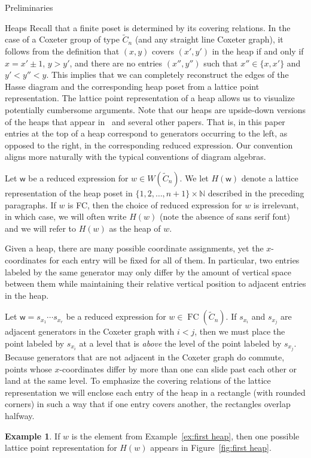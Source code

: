 \documentclass[11pt]{amsart}
\theoremstyle{definition}
\newtheorem{example}[theorem]{Example}
\numberwithin{equation}{section}
\newcommand{\N}{\mathbb{N}}
\newcommand{\C}{\widetilde{C}}
\renewcommand{\(}{\left(}
\renewcommand{\)}{\right)}
\newcommand{\w}{\mathsf{w}}
\DeclareMathOperator{\FC}{FC}
\begin{document}
\begin{section}{Preliminaries}
\begin{subsection}{Heaps}
Recall that a finite poset is determined by its covering relations.  In the case of a Coxeter group of type $\C_{n}$ (and any straight line Coxeter graph), it follows from the definition that $(x,y)$ covers $(x',y')$ in the heap if and only if $x = x' \pm 1$, $y > y'$, and there are no entries $(x'', y'')$ such that $x'' \in \{x, x'\}$ and $y'< y'' < y$.  This implies that we can completely reconstruct the edges of the Hasse diagram and the corresponding heap poset from a lattice point representation. The lattice point representation of a heap allows us to visualize potentially cumbersome arguments.  Note that our heaps are upside-down versions of the heaps that appear in~\cite{Billey2007} and several other papers.  That is, in this paper entries at the top of a heap correspond to generators occurring to the left, as opposed to the right, in the corresponding reduced expression.  Our convention aligns more naturally with the typical conventions of diagram algebras.

Let $\w$ be a reduced expression for $w \in W(\C_{n})$.  We let $H(\w)$ denote a lattice representation of the heap poset in $\{1,2,\ldots,n+1\} \times \N$ described in the preceding paragraphs.  If $w$ is FC, then the choice of reduced expression for $w$ is irrelevant, in which case, we will often write $H(w)$ (note the absence of \textsf{sans serif} font) and we will refer to $H(w)$ as the heap of $w$.

Given a heap, there are many possible coordinate assignments, yet the $x$-coordinates for each entry will be fixed for all of them.  In particular, two entries labeled by the same generator may only differ by the amount of vertical space between them while maintaining their relative vertical position to adjacent entries in the heap.

Let $\w=s_{x_1}\cdots s_{x_r}$ be a reduced expression for $w \in \FC(\C_{n})$.  If $s_{x_i}$ and $s_{x_j}$ are adjacent generators in the Coxeter graph with $i<j$, then we must place the point labeled by $s_{x_i}$ at a level that is \emph{above} the level of the point labeled by $s_{x_j}$.  Because generators that are not adjacent in the Coxeter graph do commute, points whose $x$-coordinates differ by more than one can slide past each other or land at the same level.  To emphasize the covering relations of the lattice representation we will enclose each entry of the heap in a rectangle (with rounded corners) in such a way that if one entry covers another, the rectangles overlap halfway.

\begin{example}\label{ex:second heap}
If $w$ is the element from Example~\ref{ex:first heap}, then one possible lattice point representation for $H(w)$ appears in Figure~\ref{fig:first heap}.
\end{example}


\end{subsection}
\end{section}
\end{document}

